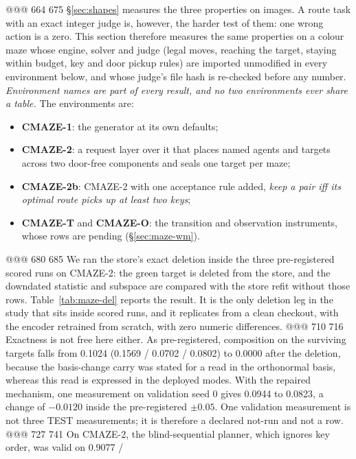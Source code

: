 @@@ 664 675
\S\ref{sec:shapes} measures the three properties on images. A route task with an exact
integer judge is, however, the harder test of them: one wrong action is a zero. This section
therefore measures the same properties on a colour maze whose engine, solver and judge (legal
moves, reaching the target, staying within budget, key and door pickup rules) are imported
unmodified in every environment below, and whose judge's file hash is re-checked before any
number. %
\emph{Environment names are part of every result, and no two environments ever share a
table.} The environments are:
\begin{itemize}[leftmargin=*,nosep]
\item \textbf{CMAZE-1}: the generator at its own defaults;
\item \textbf{CMAZE-2}: a request layer over it that places named agents and targets across two
  door-free components and seals one target per maze;
\item \textbf{CMAZE-2b}: CMAZE-2 with one acceptance rule added, \emph{keep a pair iff its
  optimal route picks up at least two keys};
\item \textbf{CMAZE-T} and \textbf{CMAZE-O}: the transition and observation instruments, whose
  rows are pending (\S\ref{sec:maze-wm}).
\end{itemize}
@@@ 680 685
We ran the store's exact deletion inside the three pre-registered scored runs on CMAZE-2: the
green target is deleted from the store, and the downdated statistic and subspace are compared
with the store refit without those rows. Table~\ref{tab:maze-del} reports the result. It is the
only deletion leg in the study that sits inside scored runs, and it replicates from a clean
checkout, with the encoder retrained from scratch, with zero numeric differences.
@@@ 710 716
\noindent Exactness is not free here either. As pre-registered, composition on the surviving
targets falls from 0.1024 (0.1569 / 0.0702 / 0.0802) to 0.0000 after the deletion, because the
basis-change carry was stated for a read in the orthonormal basis, whereas this read is expressed
in the deployed modes. With the repaired mechanism, one measurement on validation seed 0 gives
0.0944 to 0.0823, a change of $-0.0120$ inside the pre-registered $\pm0.05$. One validation
measurement is not three TEST measurements; it is therefore a declared not-run and not a row.
@@@ 727 741
On CMAZE-2, the blind-sequential planner, which ignores key order, was valid on 0.9077 /
